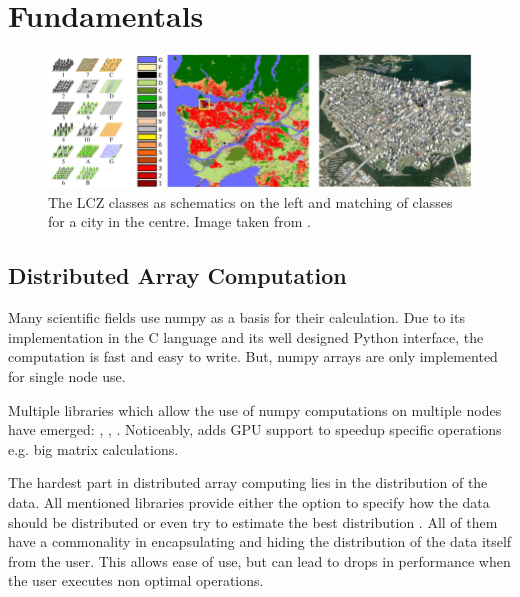 \section{Fundamentals}
\label{sec:fundamentals}

\begin{figure}[t]
  \centering
  \includegraphics[width=0.9\linewidth]{images/schematic-lcz.png}
  \caption{The LCZ classes as schematics on the left and matching of classes for a city in the centre. Image taken from \cite{zhu_so2sat_2019}.}\label{fig:lcz_classes}
\end{figure}


\subsection{Distributed Array Computation}
\label{subsec:distributed_array_computation}
Many scientific fields use \gls{numpy} as a basis for their calculation. Due to its implementation in the C language and its well designed
Python interface, the computation is fast and easy to write. But, \gls{numpy} arrays are only implemented for single node use.

Multiple libraries which allow the use of \gls{numpy} computations on multiple nodes have emerged: \cite{bauer_legate_2019}, \cite{huang_spartan_nodate}, \cite{krajsek_helmholtz_nodate}.
Noticeably, \cite{bauer_legate_2019} adds \gls{GPU} support to speedup specific operations e.g. big matrix calculations.

The hardest part in distributed array computing lies in the distribution of the data. All mentioned libraries provide
either the option to specify how the data should be distributed or even try to estimate the best distribution \cite{huang_spartan_nodate}.
All of them have a commonality in encapsulating and hiding the distribution of the data itself from the user.
This allows ease of use, but can lead to drops in performance when the user executes non optimal operations.


